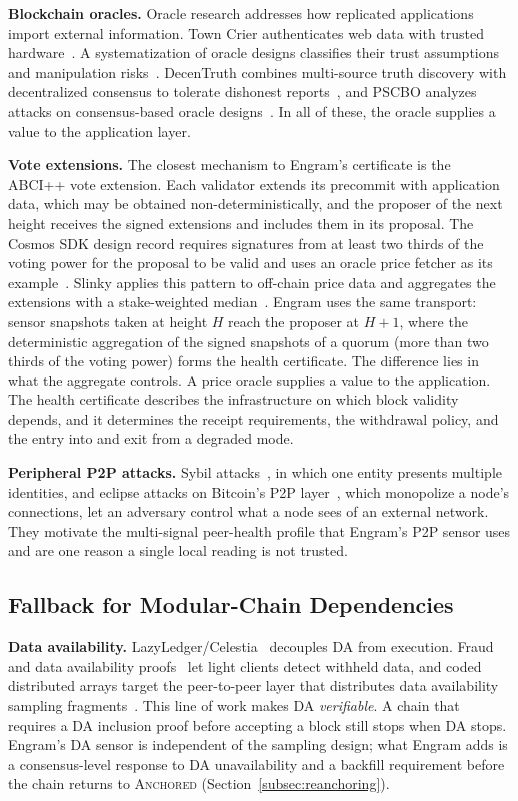 \textbf{Blockchain oracles.}
Oracle research addresses how replicated applications import external
information. Town Crier authenticates web data with trusted
hardware~\cite{zhang2016towncrier}. A systematization of oracle designs
classifies their trust assumptions and manipulation
risks~\cite{eskandari2021oraclesok}. DecenTruth combines multi-source truth
discovery with decentralized consensus to tolerate dishonest
reports~\cite{xiao2023decentruth}, and PSCBO analyzes attacks on consensus-based
oracle designs~\cite{yao2025pscbo}. In all of these, the oracle supplies a value
to the application layer.

\textbf{Vote extensions.}
The closest mechanism to Engram's certificate is the ABCI++ vote extension.
Each validator extends its precommit with application data, which may be
obtained non-deterministically, and the proposer of the next height receives
the signed extensions and includes them in its proposal. The Cosmos SDK design
record requires signatures from at least two thirds of the voting power for the
proposal to be valid and uses an oracle price fetcher as its
example~\cite{cosmos_adr064}. Slinky applies this pattern to off-chain price
data and aggregates the extensions with a stake-weighted
median~\cite{slinky_oracle}. Engram uses the same transport: sensor snapshots
taken at height $H$ reach the proposer at $H{+}1$, where the
deterministic aggregation of the signed snapshots of a quorum (more than two
thirds of the voting power) forms the health certificate. The difference lies in what the
aggregate controls. A price oracle supplies a value to the application. The health
certificate describes the infrastructure on which block validity depends, and it
determines the receipt requirements, the withdrawal policy, and the entry into
and exit from a degraded mode.

\textbf{Peripheral P2P attacks.}
Sybil attacks~\cite{douceur2002sybil}, in which one entity presents multiple
identities, and eclipse attacks on Bitcoin's P2P
layer~\cite{heilman2015eclipse,rehman2025eclipse}, which monopolize a node's
connections, let an adversary control what a node sees of an external network. They motivate the multi-signal peer-health
profile that Engram's P2P sensor uses and are one reason a single local reading
is not trusted.

\subsection{Fallback for Modular-Chain Dependencies}
\label{subsec:settlement}
\textbf{Data availability.}
LazyLedger/Celestia~\cite{albassam2019lazyledger} decouples DA from execution.
Fraud and data availability proofs~\cite{albassam2021fraud} let light clients
detect withheld data, and coded distributed arrays target the peer-to-peer layer that
distributes data availability sampling fragments~\cite{phamminh2026cda}. This line of work makes DA
\emph{verifiable}. A chain that requires a DA inclusion proof before accepting a
block still stops when DA stops. Engram's DA sensor is independent of the
sampling design; what Engram adds is a consensus-level response to DA
unavailability and a backfill requirement before the chain returns to
\textsc{Anchored} (Section~\ref{subsec:reanchoring}).

